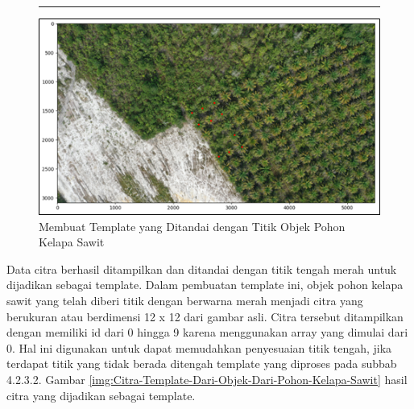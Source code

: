 \begin{figure}[H]
	\vspace{-0.1cm}
	\rule{\columnwidth}{0.1pt}
	\begin{center}
		\includegraphics[width=1\columnwidth]{bab4/Gambar/Picture12.png}
	\end{center}
	\vspace{-0.2cm}
	\captionsetup{justification=centering}
	\caption{Membuat Template yang Ditandai dengan Titik Objek Pohon Kelapa Sawit}\label{img:Membuat-Template-Yang-Ditandai}
\end{figure}

Data citra berhasil ditampilkan dan ditandai dengan titik tengah merah untuk dijadikan sebagai template. Dalam pembuatan template ini, objek pohon kelapa sawit yang telah diberi titik dengan berwarna merah menjadi citra yang berukuran atau berdimensi 12 x 12 dari gambar asli. Citra tersebut ditampilkan dengan memiliki id dari 0 hingga 9 karena menggunakan array yang dimulai dari 0. Hal ini digunakan untuk dapat memudahkan penyesuaian titik tengah, jika terdapat titik yang tidak berada ditengah template yang diproses pada subbab 4.2.3.2. Gambar \ref{img:Citra-Template-Dari-Objek-Dari-Pohon-Kelapa-Sawit} hasil citra yang dijadikan sebagai template. 

